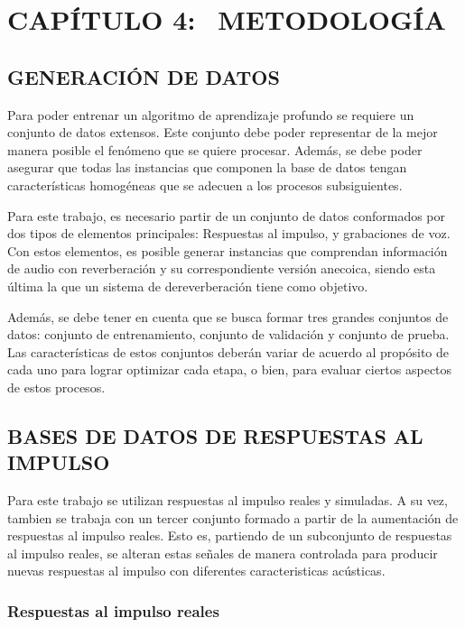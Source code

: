 \section[Metodología]{CAPÍTULO 4:$\ \ \ \ $METODOLOGÍA} 

\subsection[Análisis de datos]{GENERACIÓN DE DATOS}
Para poder entrenar un algoritmo de aprendizaje profundo se requiere un conjunto de datos extensos. Este conjunto debe poder representar de la mejor manera posible el fenómeno que se quiere procesar. Además, se debe poder asegurar que todas las instancias que componen la base de datos tengan características homogéneas que se adecuen a los procesos subsiguientes. 

Para este trabajo, es necesario partir de un conjunto de datos conformados por dos tipos de elementos principales: Respuestas al impulso, y grabaciones de voz. Con estos elementos, es posible generar instancias que comprendan información de audio con reverberación y su correspondiente versión anecoica, siendo esta última la que un sistema de dereverberación tiene como objetivo.

Además, se debe tener en cuenta que se busca formar tres grandes conjuntos de datos: conjunto de entrenamiento, conjunto de validación y conjunto de prueba. Las características de estos conjuntos deberán variar de acuerdo al propósito de cada uno para lograr optimizar cada etapa, o bien, para evaluar ciertos aspectos de estos procesos.    


\subsection[Base de datos de respuestas al impulso]{BASES DE DATOS DE RESPUESTAS AL IMPULSO}

Para este trabajo se utilizan respuestas al impulso reales y simuladas. A su vez, tambien se trabaja con un tercer conjunto formado a partir de la aumentación de respuestas al impulso reales. Esto es, partiendo de un subconjunto de respuestas al impulso reales, se alteran estas señales de manera controlada para producir nuevas respuestas al impulso con diferentes caracteristicas acústicas.

\subsubsection{Respuestas al impulso reales}

